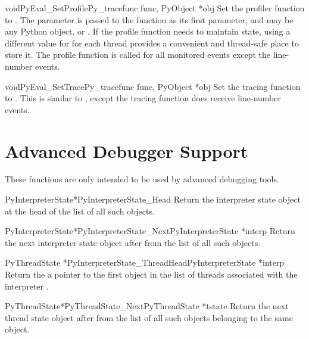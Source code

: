 \begin{cfuncdesc}{void}{PyEval_SetProfile}{Py_tracefunc func, PyObject *obj}
  Set the profiler function to .  The  parameter is
  passed to the function as its first parameter, and may be any Python
  object, or \NULL.  If the profile function needs to maintain state,
  using a different value for  for each thread provides a
  convenient and thread-safe place to store it.  The profile function
  is called for all monitored events except the line-number events.
\end{cfuncdesc}

\begin{cfuncdesc}{void}{PyEval_SetTrace}{Py_tracefunc func, PyObject *obj}
  Set the tracing function to .  This is similar to
  , except the tracing function does
  receive line-number events.
\end{cfuncdesc}


\section{Advanced Debugger Support \label{advanced-debugging}}

These functions are only intended to be used by advanced debugging
tools.

\begin{cfuncdesc}{PyInterpreterState*}{PyInterpreterState_Head}{}
  Return the interpreter state object at the head of the list of all
  such objects.
\end{cfuncdesc}

\begin{cfuncdesc}{PyInterpreterState*}{PyInterpreterState_Next}{PyInterpreterState *interp}
  Return the next interpreter state object after  from the
  list of all such objects.
\end{cfuncdesc}

\begin{cfuncdesc}{PyThreadState *}{PyInterpreterState_ThreadHead}{PyInterpreterState *interp}
  Return the a pointer to the first  object in
  the list of threads associated with the interpreter .
\end{cfuncdesc}

\begin{cfuncdesc}{PyThreadState*}{PyThreadState_Next}{PyThreadState *tstate}
  Return the next thread state object after  from the list
  of all such objects belonging to the same 
  object.
\end{cfuncdesc}
